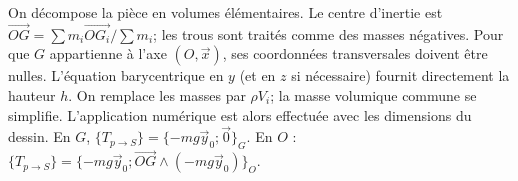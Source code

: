 \begin{corrigebox}
On décompose la pièce en volumes élémentaires. Le centre d'inertie est
                $\overrightarrow{OG}=\sum m_i\overrightarrow{OG_i}/\sum m_i$; les trous
                sont traités comme des masses négatives.
Pour que $G$ appartienne à l'axe $(O,\vec x)$, ses coordonnées
                transversales doivent être nulles. L'équation barycentrique en $y$ (et en
                $z$ si nécessaire) fournit directement la hauteur $h$.
On remplace les masses par $\rho V_i$; la masse volumique commune se
                simplifie. L'application numérique est alors effectuée avec les dimensions
                du dessin.
En $G$, $\{T_{p\to S}\}=\{-mg\vec y_0;\vec0\}_G$. En $O$ :
                $\{T_{p\to S}\}=\{-mg\vec y_0;
                \overrightarrow{OG}\wedge(-mg\vec y_0)\}_O$.
\end{corrigebox}
